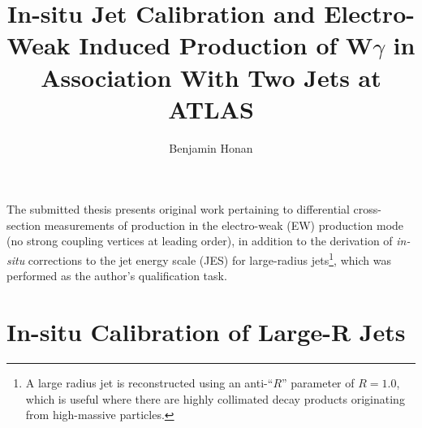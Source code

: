 \documentclass{thesissummary}
\begin{document}
\title{In-situ Jet Calibration and Electro-Weak Induced Production of W$\gamma$ in Association With Two Jets at ATLAS}

\author{ Benjamin Honan }

\address{School of Physics and Astronomy, University of Manchester, M13 9PL, United Kingdom}
\maketitle
\strut\newline
\noindent
The submitted thesis presents original work pertaining to differential cross-section measurements of \wyjj production in the electro-weak (EW) production mode (no strong coupling vertices at leading order), in addition to the derivation of \textit{in-situ} corrections to the jet energy scale (JES) for large-radius jets\footnote{A large radius jet is reconstructed using an anti-\kt ``$R$'' parameter of $R=1.0$, which is useful where there are highly collimated decay products originating from high-\pt massive particles.}, which was performed as the author's qualification task.
\section{In-situ Calibration of Large-R Jets}
\end{document}

